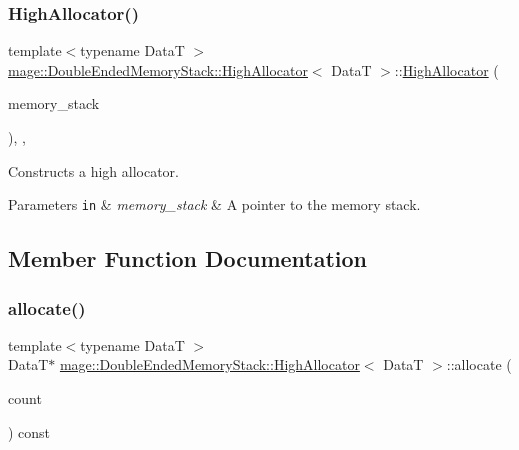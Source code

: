 \subsubsection{\texorpdfstring{High\+Allocator()}{HighAllocator()}\hspace{0.1cm}{\footnotesize\ttfamily [4/4]}}
{\footnotesize\ttfamily template$<$typename DataT $>$ \\
\mbox{\hyperlink{classmage_1_1_double_ended_memory_stack_1_1_high_allocator}{mage\+::\+Double\+Ended\+Memory\+Stack\+::\+High\+Allocator}}$<$ DataT $>$\+::\mbox{\hyperlink{classmage_1_1_double_ended_memory_stack_1_1_high_allocator}{High\+Allocator}} (\begin{DoxyParamCaption}\item[{\mbox{\hyperlink{namespacemage_a8769f9d670d6b585ea306cb1062af94b}{Not\+Null}}$<$ \mbox{\hyperlink{classmage_1_1_double_ended_memory_stack}{Double\+Ended\+Memory\+Stack}} $\ast$ $>$}]{memory\+\_\+stack }\end{DoxyParamCaption})\hspace{0.3cm}{\ttfamily [explicit]}, {\ttfamily [private]}, {\ttfamily [noexcept]}}

Constructs a high allocator.


\begin{DoxyParams}[1]{Parameters}
\mbox{\tt in}  & {\em memory\+\_\+stack} & A pointer to the memory stack. \\
\hline
\end{DoxyParams}


\subsection{Member Function Documentation}
\mbox{\label{classmage_1_1_double_ended_memory_stack_1_1_high_allocator_ab6585eebb7bb11dcee1945b11b50ea98}} 
\subsubsection{\texorpdfstring{allocate()}{allocate()}\hspace{0.1cm}{\footnotesize\ttfamily [1/2]}}
{\footnotesize\ttfamily template$<$typename DataT $>$ \\
DataT$\ast$ \mbox{\hyperlink{classmage_1_1_double_ended_memory_stack_1_1_high_allocator}{mage\+::\+Double\+Ended\+Memory\+Stack\+::\+High\+Allocator}}$<$ DataT $>$\+::allocate (\begin{DoxyParamCaption}\item[{size\+\_\+t}]{count }\end{DoxyParamCaption}) const}

